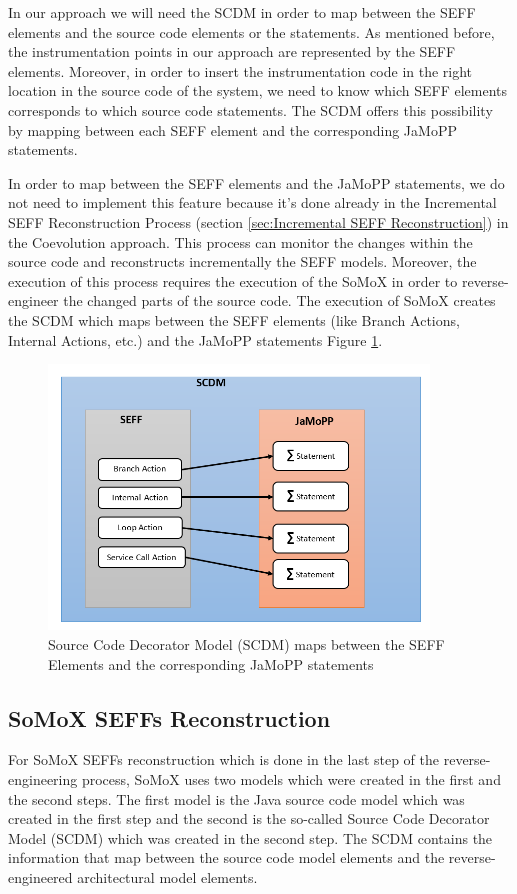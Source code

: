 In our approach we will need the SCDM in order to map between the SEFF elements and the source code elements or the statements. As mentioned before, the instrumentation points in our approach are represented by the SEFF elements. Moreover, in order to insert the instrumentation code in the right location in the source code of the system, we need to know which SEFF elements corresponds to which source code statements. The SCDM offers this possibility by mapping between each SEFF element and the corresponding JaMoPP statements. 

In order to map between the SEFF elements and the JaMoPP statements, we do not need to implement this feature because it's done already in the Incremental SEFF Reconstruction Process (section \ref{sec:Incremental SEFF Reconstruction}) in the Coevolution approach. This process can monitor the changes within the source code and reconstructs incrementally the SEFF models. Moreover, the execution of this process requires the execution of the SoMoX in order to reverse-engineer the changed parts of the source code. The execution of SoMoX creates the SCDM which maps between the SEFF elements (like Branch Actions, Internal Actions, etc.) and the JaMoPP statements Figure \ref{fig:seff jamopp}.


\begin{figure}[h]
\centering
\includegraphics[width=0.9\textwidth]{figures/seff_jamopp}
\caption{Source Code Decorator Model (SCDM) maps between the SEFF Elements and the corresponding JaMoPP statements}
\label{fig:seff jamopp}
\end{figure}

\subsection{SoMoX SEFFs Reconstruction}  
\label{sec:SoMoX SEFFs Reconstruction}
For SoMoX SEFFs reconstruction which is done in the last step of the reverse-engineering process, SoMoX uses two models which were created in the first and the second steps. The first model is the Java source code model which was created in the first step and the second is the so-called Source Code Decorator Model (SCDM) which was created in the second step. The SCDM contains the information that map between the source code model elements and the reverse-engineered architectural model elements.

